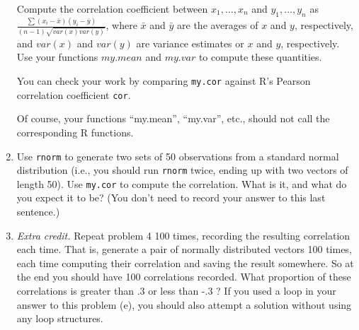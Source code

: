 \documentclass[11pt]{article}
\theoremstyle{plain}
\theoremstyle{definition}
\begin{document}
\begin{enumerate}
Compute the correlation coefficient between $x_1,\ldots,x_n$ and $y_1,\ldots,y_n$ as $\frac{ \sum{(x_i-\bar{x})(y_i-\bar{y})}} {(n-1)\sqrt{var(x)var(y)}}$, where $\bar{x}$ and $\bar{y}$ are the averages of $x$ and $y$, respectively, and $var(x)$ and $var(y)$ are variance estimates or $x$ and $y$, respectively. Use your functions $my.mean$ and $my.var$ to compute these quantities.

You can check your work by comparing \texttt{my.cor} against R's Pearson correlation coefficient \texttt{cor}.

\medskip
Of course, your functions ``my.mean'', ``my.var'', etc., should not call the corresponding R functions.

\item Use \texttt{rnorm} to generate two sets of 50 observations from a standard normal distribution (i.e., you should run \texttt{rnorm} twice, ending up with two vectors of length 50). Use \texttt{my.cor} to compute the correlation. What is it, and what do you expect it to be? (You don't need to record your answer to this last sentence.)


\item \emph{Extra credit.} Repeat problem 4 100 times, recording the resulting correlation each time. That is, generate a pair of normally distributed vectors 100 times, each time computing their correlation and saving the result somewhere. So at the end you should have 100 correlations recorded. What proportion of these correlations is greater than .3 or less than -.3 ? If you used a loop in your answer to this problem (e), you should also attempt a solution without using any loop structures.


\end{enumerate}
\end{document}
